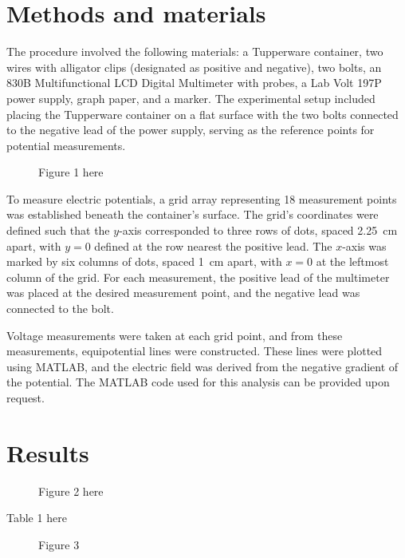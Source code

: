 ﻿\documentclass[10pt,journal]{IEEEtran}
\begin{document}
 \section{Methods and materials}
 The procedure involved the following materials: a Tupperware container, two wires with alligator clips (designated as positive and negative), two bolts, an 830B Multifunctional LCD Digital Multimeter with probes, a Lab Volt 197P power supply, graph paper, and a marker. The experimental setup included placing the Tupperware container on a flat surface with the two bolts connected to the negative lead of the power supply, serving as the reference points for potential measurements.                          
\begin{figure}
\caption{ Figure 1  here}
\label{fig:1}
\end{figure}

To measure electric potentials, a  grid array representing 18 measurement points was established beneath the container’s surface. The grid's coordinates were defined such that the $y$-axis corresponded to three rows of dots, spaced \qty{2.25}{\centi\meter} apart, with $y=0$ defined at the row nearest the positive lead. The $x$-axis was marked by six columns of dots, spaced \qty{1}{\centi\meter} apart, with $x=0$ at the leftmost column of the grid. For each measurement, the positive lead of the multimeter was placed at the desired measurement point, and the negative lead was connected to the bolt.

Voltage measurements were taken at each grid point, and from these measurements, equipotential lines were constructed. These lines were plotted using MATLAB, and the electric field was derived from the negative gradient of the potential. The MATLAB code used for this analysis can be provided upon request.






\section{Results}
\begin{figure}
\caption{Figure 2 here}
\label{fig:2}
\end{figure}

\begin{table}
\caption{Table 1 here}
\label{tab:1}
\end{table}
	
\begin{figure}
\caption{Figure 3}
\label{fig:3}
\end{figure} 
  
\end{document}
